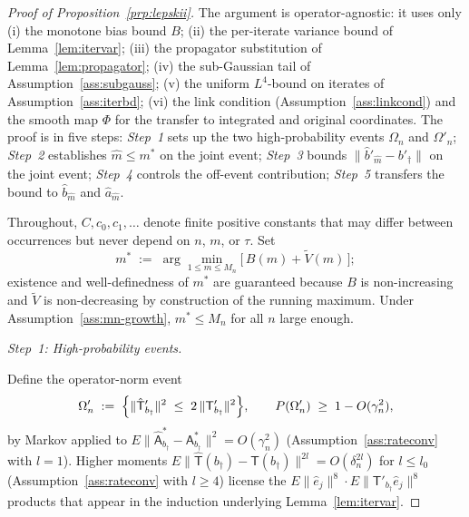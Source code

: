 %

\begin{proof}[Proof of Proposition~\ref{prp:lepskii}]
The argument is operator-agnostic: it uses only
(i) the monotone bias bound $B$;
(ii) the per-iterate variance bound of Lemma~\ref{lem:itervar};
(iii) the propagator substitution of Lemma~\ref{lem:propagator};
(iv) the sub-Gaussian tail of Assumption~\ref{ass:subgauss};
(v) the uniform $L^4$-bound on iterates of Assumption~\ref{ass:iterbd};
(vi) the link condition (Assumption~\ref{ass:linkcond}) and the smooth map
$\Phi$ for the transfer to integrated and original coordinates.
The proof is in five steps: \emph{Step~1} sets up the two high-probability
events $\Omega_n$ and $\Omega'_n$; \emph{Step~2} establishes
$\hat m \le m^*$ on the joint event; \emph{Step~3} bounds
$\|\hat b'_{\hat m} - b'_\dagger\|$ on the joint event; \emph{Step~4}
controls the off-event contribution; \emph{Step~5} transfers the bound to
$\hat b_{\hat m}$ and $\hat a_{\hat m}$.

Throughout, $C, c_0, c_1, \ldots$ denote finite positive constants that may
differ between occurrences but never depend on $n$, $m$, or $\tau$. Set
\[
m^{*} \;:=\; \arg\min_{1 \le m \le M_n}\!\bigl[\,B(m) + \tilde V(m)\,\bigr];
\]
existence and well-definedness of $m^*$ are guaranteed because $B$ is
non-increasing and $\tilde V$ is non-decreasing by construction of the
running maximum. %
Under Assumption~\ref{ass:mn-growth}, $m^* \le M_n$ for all $n$ large
enough. %

\smallskip
\emph{Step~1: High-probability events.}

Define the operator-norm event %
\begin{equation}\label{eq:Omegaprime-pf}
\Omega'_n \;:=\; \Bigl\{\|\hat{\mathsf T}'_{b_\dagger}\|^2
\;\le\; 2\,\|\mathsf T'_{b_\dagger}\|^2\Bigr\},
\qquad P(\Omega'_n) \;\ge\; 1 - O(\gamma_n^2),
\end{equation}
by Markov applied to
$E\|\hat{\mathsf A}^{*}_{b_\dagger} - \mathsf A^{*}_{b_\dagger}\|^2 = O(\gamma_n^2)$
(Assumption~\ref{ass:rateconv} with $l = 1$). Higher moments
$E\|\hat{\mathsf T}(b_\dagger) - \mathsf T(b_\dagger)\|^{2l} = O(\delta_n^{2l})$
for $l \le l_0$ (Assumption~\ref{ass:rateconv} with $l \ge 4$) %
license the $E\|\hat e_j\|^8 \cdot E\|\mathsf T'_{b_\dagger}\hat e_j\|^8$
products that appear in the induction underlying Lemma~\ref{lem:itervar}.


\end{proof}
